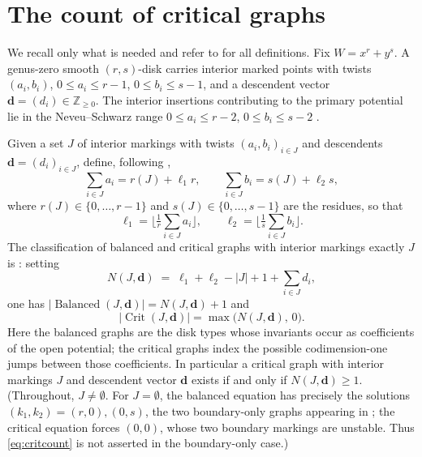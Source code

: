 \documentclass[11pt]{amsart}
\theoremstyle{definition}
\theoremstyle{remark}
\newcommand{\ZZ}{\mathbb{Z}}
\newcommand{\Crit}{\operatorname{Crit}}
\newcommand{\Bal}{\operatorname{Balanced}}
\begin{document}
\section{The count of critical graphs}
\label{sec:count}

We recall only what is needed and refer to \cite{GKT} for all definitions. Fix
$W=x^{r}+y^{s}$. A genus-zero smooth $(r,s)$-disk carries interior marked points
with twists $(a_{i},b_{i})$, $0\leq a_{i}\leq r-1$, $0\leq b_{i}\leq s-1$, and a
descendent vector $\mathbf d=(d_{i})\in\ZZ_{\geq0}$. The interior insertions
contributing to the primary potential lie in the Neveu--Schwarz range
$0\leq a_{i}\leq r-2$, $0\leq b_{i}\leq s-2$ \cite[eqn.~(0.5)]{GKT}.

Given a set $J$ of interior markings with twists $(a_{i},b_{i})_{i\in J}$ and
descendents $\mathbf d=(d_{i})_{i\in J}$, define, following
\cite[Notation~2.30]{GKT},
\begin{equation}
\label{eq:ells}
\sum_{i\in J}a_{i}=r(J)+\ell_{1}r,\qquad
\sum_{i\in J}b_{i}=s(J)+\ell_{2}s,
\end{equation}
where $r(J)\in\{0,\dots,r-1\}$ and $s(J)\in\{0,\dots,s-1\}$ are the residues, so
that
\begin{equation}
\label{eq:elldef}
\ell_{1}=\Big\lfloor\tfrac{1}{r}\textstyle\sum_{i\in J}a_{i}\Big\rfloor,\qquad
\ell_{2}=\Big\lfloor\tfrac{1}{s}\textstyle\sum_{i\in J}b_{i}\Big\rfloor.
\end{equation}
The classification of balanced and critical graphs with interior markings
exactly $J$ is \cite[Notation~2.40]{GKT}: setting
\begin{equation}
\label{eq:N}
N(J,\mathbf d)\;=\;\ell_{1}+\ell_{2}-|J|+1+\sum_{i\in J}d_{i},
\end{equation}
one has $\bigl|\Bal(J,\mathbf d)\bigr|=N(J,\mathbf d)+1$ and
\begin{equation}
\label{eq:critcount}
\bigl|\Crit(J,\mathbf d)\bigr|=\max\bigl(N(J,\mathbf d),\,0\bigr).
\end{equation}
Here the balanced graphs are the disk types whose invariants occur as
coefficients of the open potential; the critical graphs index the possible
codimension-one jumps between those coefficients.
In particular a critical graph with interior markings $J$ and descendent vector
$\mathbf d$ exists if and only if $N(J,\mathbf d)\geq1$. (Throughout,
$J\neq\emptyset$. For $J=\emptyset$, the balanced equation has precisely the
solutions $(k_{1},k_{2})=(r,0),(0,s)$, the two boundary-only graphs appearing
in \cite[Example~3.4]{GKT}; the critical equation forces $(0,0)$, whose two
boundary markings are unstable. Thus \eqref{eq:critcount} is not asserted in
the boundary-only case.)
\end{document}
